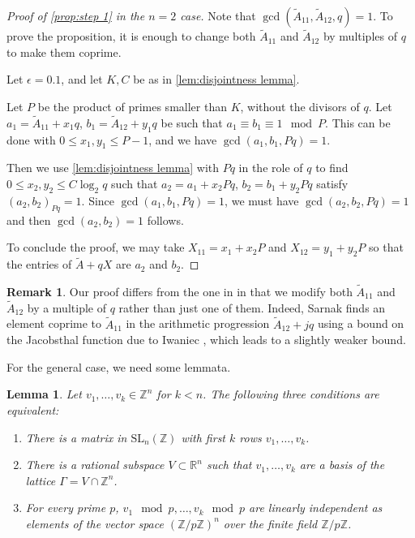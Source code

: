 \documentclass[12pt, a4paper]{amsart}
\numberwithin{equation}{section}
\newtheorem{lemma}[theorem]{Lemma}
\theoremstyle{definition}
\newtheorem{remark}[theorem]{Remark}
\newcommand{\R}{\mathbb{R}}
\newcommand{\Z}{\mathbb{Z}}
\newcommand{\SL}{\mathrm{SL}}
\newcommand{\wt}{\widetilde}
\begin{document}
\begin{proof}[Proof of \cref{prop:step 1} in the $n=2$ case]
Note that $\gcd(\wt A_{11},\wt A_{12},q)=1$.
To prove the proposition, it is enough
to change both $\wt A_{11}$ and $\wt A_{12}$ by multiples of $q$ to make them coprime.

Let $\epsilon=0.1$, and let $K,C$ be as in \cref{lem:disjointness lemma}. 

Let $P$ be the product of primes smaller than $K$, without the divisors of $q$.
Let $a_{1}=\wt A_{11}+x_{1}q$, $b_{1}=\wt A_{12}+y_{1}q$ be such that $a_{1}\equiv b_{1}\equiv 1\mod P$.
This can be done with $0\le x_{1},y_{1}\le P-1$, and we have $\gcd(a_1,b_1,Pq)=1$.

Then we use \cref{lem:disjointness lemma} with $Pq$ in the role of $q$
to find $0\le x_{2},y_{2}\le C\log_{2}q$
such that $a_{2}=a_{1}+x_{2}Pq$, $b_{2}=b_{1}+y_{2}Pq$ satisfy
$(a_{2},b_{2})_{Pq}=1$. Since $\gcd(a_1,b_1,Pq)=1$, we must have
$\gcd(a_2,b_2,Pq)=1$ and then $\gcd(a_{2},b_{2})=1$ follows. 

To conclude the proof, we may take $X_{11}=x_1+x_2P$ and $X_{12}=y_1+y_2P$ so that
the entries of $\wt A+qX$ are $a_2$ and $b_2$.
\end{proof}

\begin{remark}\label{rmk:compare with Sarnak}
Our proof differs from the one in \cite{sarnak2015lettermiller} in that we
modify both $\wt A_{11}$ and $\wt A_{12}$ by a multiple of $q$ rather than just one of them.
Indeed, Sarnak finds an element coprime to $\wt A_{11}$ in the arithmetic progression
$\wt A_{12}+jq$ using a bound on the Jacobsthal function due to Iwaniec \cite{iwaniec1978},
which leads to a slightly weaker bound.
\end{remark}
For the general case, we need some lemmata. 
\begin{lemma}
\label{lem:primitive lattice}Let $v_{1},\ldots,v_{k}\in\Z^{n}$ for $k<n$. 
The following three conditions are equivalent:
\begin{enumerate}
\item There is a matrix in $\SL_{n}(\Z)$ with first $k$ rows $v_{1},\ldots,v_{k}$.
\item There is a rational subspace $V\subset \R^n$ such that $v_1,\ldots,v_k$ are a basis of the lattice $\Gamma = V\cap \Z^n$.
\item For every prime $p$, $v_{1}\mod p,\ldots,v_{k}\mod p$ are linearly independent as elements
of the vector space $(\Z/p\Z)^{n}$ over the finite field $\Z/p\Z$.
\end{enumerate}
\end{lemma}
\end{document}
